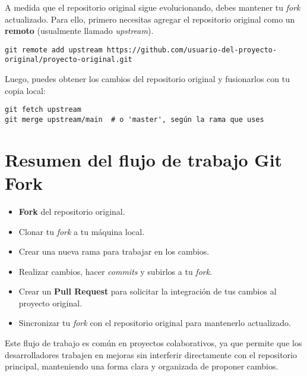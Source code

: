 \documentclass{article}
\begin{document}
A medida que el repositorio original sigue evolucionando, debes mantener tu \textit{fork} actualizado. Para ello, primero necesitas agregar el repositorio original como un \textbf{remoto} (usualmente llamado \textit{upstream}).

\begin{verbatim}
git remote add upstream https://github.com/usuario-del-proyecto-original/proyecto-original.git
\end{verbatim}

Luego, puedes obtener los cambios del repositorio original y fusionarlos con tu copia local:

\begin{verbatim}
git fetch upstream
git merge upstream/main  # o 'master', según la rama que uses
\end{verbatim}

\section{Resumen del flujo de trabajo Git Fork}

\begin{itemize}
    \item \textbf{Fork} del repositorio original.
    \item Clonar tu \textit{fork} a tu máquina local.
    \item Crear una nueva rama para trabajar en los cambios.
    \item Realizar cambios, hacer \textit{commits} y subirlos a tu \textit{fork}.
    \item Crear un \textbf{Pull Request} para solicitar la integración de tus cambios al proyecto original.
    \item Sincronizar tu \textit{fork} con el repositorio original para mantenerlo actualizado.
\end{itemize}

Este flujo de trabajo es común en proyectos colaborativos, ya que permite que los desarrolladores trabajen en mejoras sin interferir directamente con el repositorio principal, manteniendo una forma clara y organizada de proponer cambios.
\end{document}
